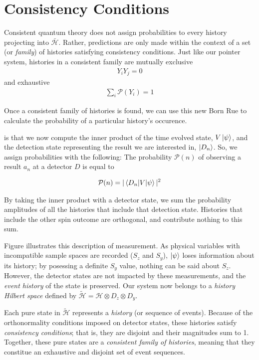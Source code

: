 \section{Consistency Conditions}

Consistent quantum theory does not assign probabilities to every history projecting into $\bar{\mathcal{H}}$. Rather, predictions are only made within the context of a set (or \textit{family}) of histories satisfying consistency conditions. Just like our pointer system, histories in a consistent family are mutually exclusive
\begin{align}
  Y_i Y_j = 0
\end{align}
and exhaustive
\begin{align}
  \sum_{i} \mathcal{P}(Y_i) = 1
\end{align}



Once a consistent family of histories is found, we can use this new Born Rue to calculate the probability of a particular history's occurence.

is that we now compute the inner product of the time evolved state, $V\ket{\psi}$, and the detection state representing the result we are interested in, $\ket{D_n}$. So, we assign probabilities with the following:
The probability $\mathcal{P}(n)$ of observing a result $a_n$ at a detector $D$ is equal to

\begin{align}
  \mathcal{P}(n) = |\braket{D_n|V|\psi}|^2
\end{align}

By taking the inner product with a detector state, we sum the probability amplitudes of all the histories that include that detection state. Histories that include the other spin outcome are orthogonal, and contribute nothing to this sum.



Figure  illustrates this description of measurement. As physical variables with incompatible sample spaces are recorded ($S_z$ and $S_y$), $\ket{\psi}$ loses information about its history; by posessing a definite $S_y$ value, nothing can be said about $S_z$. However, the detector states are not impacted by these measurements, and the \textit{event history} of the state is preserved. Our system now belongs to a \textit{history Hilbert space} defined by $\widetilde{\mathcal{H}} = \mathcal{H} \otimes D_z \otimes D_y$.

Each pure state in $\widetilde{\mathcal{H}}$ represents a \textit{history} (or sequence of events). Because of the orthonormality conditions imposed on detector states, these histories satisfy \textit{consistency conditions}; that is, they are disjoint and their magnitudes sum to 1. Together, these pure states are a \textit{consistent family of histories}, meaning that they constitue an exhaustive and disjoint set of event sequences.


